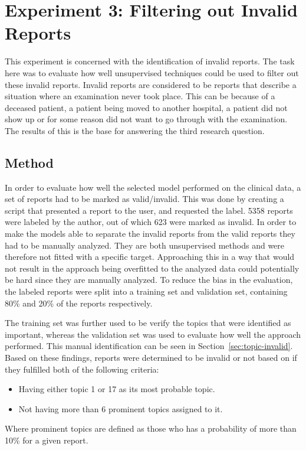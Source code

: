 \section{Experiment 3: Filtering out Invalid Reports}

This experiment is concerned with the identification of invalid reports.
The task here was to evaluate how well unsupervised techniques could be used to filter out these invalid reports.
Invalid reports are considered to be reports that describe a situation where an examination never took place.
This can be because of a deceased patient, a patient being moved to another hospital, a patient did not show up or for some reason did not want to go through with the examination.
The results of this is the base for answering the third research question.

\subsection{Method}
\label{sec:exp3-method}

In order to evaluate how well the selected model performed on the clinical data, a set of reports had to be marked as valid/invalid.
This was done by creating a script that presented a report to the user, and requested the label.
5358 reports were labeled by the author, out of which 623 were marked as invalid. 
In order to make the models able to separate the invalid reports from the valid reports they had to be manually analyzed.
They are both unsupervised methods and were therefore not fitted with a specific target.
Approaching this in a way that would not result in the approach being overfitted to the analyzed data could potentially be hard since they are manually analyzed. 
To reduce the bias in the evaluation, the labeled reports were split into a training set and validation set, containing 80\% and 20\% of the reports respectively.

The training set was further used to be verify the topics that were identified as important, whereas the validation set was used to evaluate how well the approach performed.
This manual identification can be seen in Section~\ref{sec:topic-invalid}.
Based on these findings, reports were determined to be invalid or not based on if they fulfilled both of the following criteria:
\begin{itemize}
    \item Having either topic 1 or 17 as its most probable topic.
    \item Not having more than 6 prominent topics assigned to it.
\end{itemize}
Where prominent topics are defined as those who has a probability of more than 10\% for a given report.


